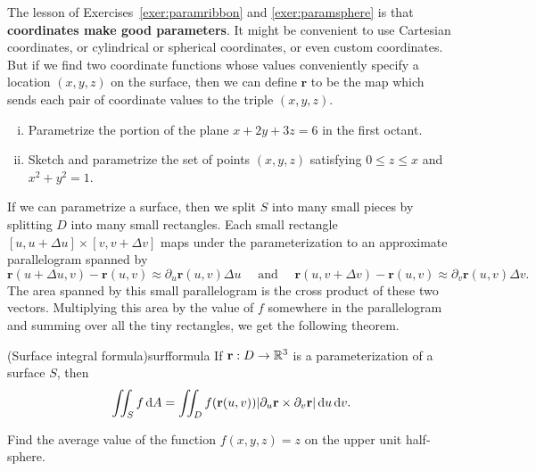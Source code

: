 \documentclass{watsonbook}
\begin{document}
The lesson of Exercises~\ref{exer:paramribbon} and
\ref{exer:paramsphere} is that \textbf{coordinates make good
  parameters}. It might be convenient to use Cartesian coordinates, or
cylindrical or spherical coordinates, or even custom coordinates. But
if we find two coordinate functions whose values conveniently specify
a location $(x,y,z)$ on the surface, then we can define $\mathbf{r}$ to be
the map which sends each pair of coordinate values to the triple $(x,y,z)$.

\begin{exercise}{}{}
  \begin{enumerate}[(i),itemsep=0pt,leftmargin=12pt]
  \item  Parametrize the portion of the plane $x + 2y + 3z = 6$ in the first
  octant. 
\item  Sketch and parametrize the set of points $(x,y,z)$ satisfying $0 \leq z
  \leq x$ and $x^2 +
  y^2 = 1$.
\end{enumerate}
\end{exercise}

If we can parametrize a surface, then we split $S$ into many small
pieces by splitting $D$ into many small rectangles. Each small
rectangle $[u,u+\Delta u] \times [v,v+\Delta v]$ maps under the
parameterization to an approximate parallelogram spanned by
\[
  \mathbf{r}(u+\Delta u, v) - \mathbf{r}(u,v) \approx \partial_u
  \mathbf{r}(u,v) \Delta u  \quad \text{ and } \quad 
  \mathbf{r}(u, v+\Delta v) - \mathbf{r}(u,v) \approx
  \partial_v
  \mathbf{r}(u,v) \Delta v. 
\]
The area spanned by this small parallelogram is the cross product of
these two vectors. Multiplying this area by the value of $f$ somewhere
in the parallelogram and summing over all the tiny rectangles, we get
the following theorem. 
\begin{theo}{(Surface integral formula)}{surfformula}
  If $\mathbf{r}:D \to \mathbb{R}^3$ is a parameterization of a surface $S$, then
  \begin{equation} \label{eq:surfformula} 
    \iint_S f \, {\mathrm{d}}A = \iint_D f(\mathbf{r}(u,v)) |\partial_u
    \mathbf{r} \times \partial_v \mathbf{r}| \, {\mathrm{d}}u\,{\mathrm{d}}v. 
  \end{equation}
\end{theo}

\begin{example}{}{}
  Find the average value of the function $f(x,y,z) = z$ on the upper
  unit half-sphere. 
\end{example}
\end{document}
